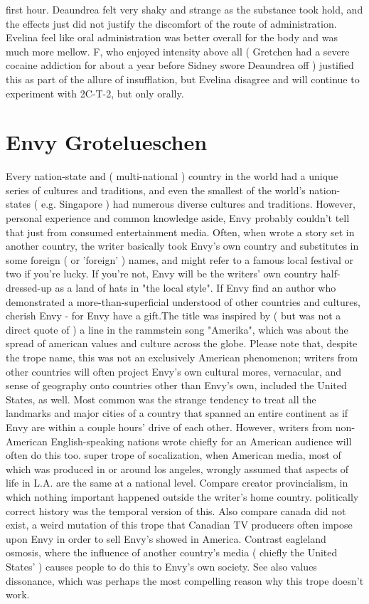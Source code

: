 \documentclass[12pt]{book}
\begin{document}
first hour. Deaundrea felt very shaky and strange as the substance took hold, and the effects just did not justify the discomfort of the route of administration. Evelina feel like oral administration was better overall for the body and was much more mellow. F, who enjoyed intensity above all ( Gretchen had a severe cocaine addiction for about a year before Sidney swore Deaundrea off ) justified this as part of the allure of insufflation, but Evelina disagree and will continue to experiment with 2C-T-2, but only orally.



\chapter{Envy Grotelueschen}

Every nation-state and ( multi-national ) country in the world had a unique series of cultures and traditions, and even the smallest of the world's nation-states ( e.g. Singapore ) had numerous diverse cultures and traditions. However, personal experience and common knowledge aside, Envy probably couldn't tell that just from consumed entertainment media. Often, when wrote a story set in another country, the writer basically took Envy's own country and substitutes in some foreign ( or 'foreign' ) names, and might refer to a famous local festival or two if you're lucky. If you're not, Envy will be the writers' own country half-dressed-up as a land of hats in "the local style". If Envy find an author who demonstrated a more-than-superficial understood of other countries and cultures, cherish Envy - for Envy have a gift.The title was inspired by ( but was not a direct quote of ) a line in the rammstein song "Amerika", which was about the spread of american values and culture across the globe. Please note that, despite the trope name, this was not an exclusively American phenomenon; writers from other countries will often project Envy's own cultural mores, vernacular, and sense of geography onto countries other than Envy's own, included the United States, as well. Most common was the strange tendency to treat all the landmarks and major cities of a country that spanned an entire continent as if Envy are within a couple hours' drive of each other. However, writers from non-American English-speaking nations wrote chiefly for an American audience will often do this too. super trope of socalization, when American media, most of which was produced in or around los angeles, wrongly assumed that aspects of life in L.A. are the same at a national level. Compare creator provincialism, in which nothing important happened outside the writer's home country. politically correct history was the temporal version of this. Also compare canada did not exist, a weird mutation of this trope that Canadian TV producers often impose upon Envy in order to sell Envy's showed in America. Contrast eagleland osmosis, where the influence of another country's media ( chiefly the United States' ) causes people to do this to Envy's own society. See also values dissonance, which was perhaps the most compelling reason why this trope doesn't work.
\end{document}
